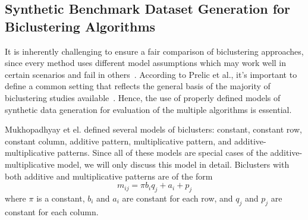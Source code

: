 


\subsection{Synthetic Benchmark Dataset Generation for Biclustering Algorithms}
\label{sec:syndata-review}

It is inherently challenging to ensure a fair comparison of biclustering approaches, since every method uses different model assumptions which may work well in certain scenarios and fail in others~\cite{prelic2006systematic}.
According to Prelic et al., it's important to define a common setting that reflects the general basis of the majority of biclustering studies available~\cite{prelic2006systematic}.
Hence, the use of properly defined models of synthetic data generation for evaluation of the multiple algorithms is essential.

Mukhopadhyay et el.\cite{mukhopadhyay2010biclustering} defined several models of biclusters: constant, constant row, constant column, additive pattern, multiplicative pattern, and additive-multiplicative patterns.
%
Since all of these models are special cases of the additive-multiplicative model, we will only discuss this model in detail. Biclusters with both additive and multiplicative patterns are of the form
\begin{equation}
	m_{ij} = \pi b_i q_j + a_i + p_j
\end{equation}
where $\pi$ is a constant, $b_i$ and $a_i$ are constant for each row, and $q_j$ and $p_j$ are constant for each column.

